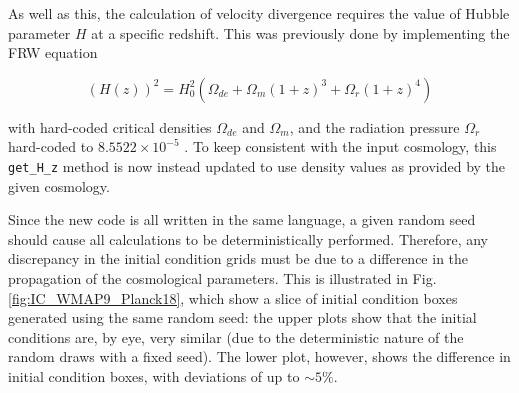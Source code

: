 \documentclass[floats,floatfix,showpacs,amssymb,prd,superscriptaddress,nofootinbib, 11pt]{revtex4-2} %
\newcommand{\code}{\texttt}
\begin{document}
As well as this, the calculation of velocity divergence requires the value of Hubble parameter $H$ at a specific redshift. This was previously done by implementing the FRW equation

\begin{equation}
    (H(z))^2 = H_0^2 (\Omega_{de} + \Omega_m (1 + z)^3 + \Omega_r (1+z)^4)
\end{equation}

\noindent with hard-coded critical densities $\Omega_{de}$ and $\Omega_m$, and the radiation pressure $\Omega_r$ hard-coded to $8.5522 \times 10^{-5}$ \citep{Planck2013results}. To keep consistent with the input cosmology, this \code{get\_H\_z} method is now instead updated to use density values as provided by the given cosmology.


Since the new code is all written in the same language, a given random seed should cause all calculations to be deterministically performed. Therefore, any discrepancy in the initial condition grids must be due to a difference in the propagation of the cosmological parameters. This is illustrated in Fig. \ref{fig:IC_WMAP9_Planck18}, which show a slice of initial condition boxes generated using the same random seed: the upper plots show that the initial conditions are, by eye, very similar (due to the deterministic nature of the random draws with a fixed seed). The lower plot, however, shows the difference in initial condition boxes, with deviations of up to $\sim 5 \%$.
\end{document}
